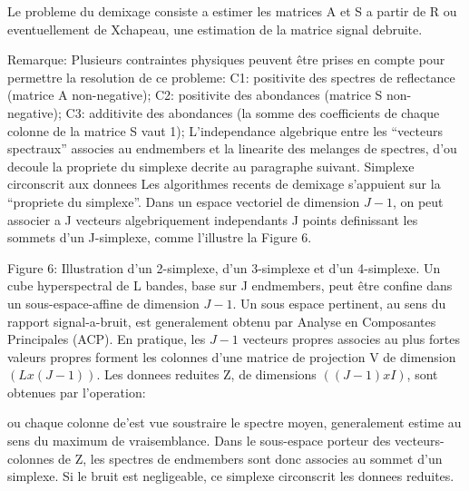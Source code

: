    

Le probleme du demixage consiste a estimer les matrices A et S a
partir de R ou eventuellement de Xchapeau, une estimation de la matrice signal
debruite.

Remarque: Plusieurs contraintes physiques peuvent être prises en
compte pour permettre la resolution de ce probleme: 
C1: positivite
des spectres de reflectance (matrice A non-negative); 
C2: positivite
des abondances (matrice S non-negative); 
C3: additivite des
abondances (la somme des coefficients de chaque colonne de la matrice
S vaut 1); 
L'independance algebrique entre les ``vecteurs spectraux''
associes au endmembers et la linearite des melanges de spectres, d'ou
decoule la propriete du simplexe decrite au paragraphe suivant.
Simplexe circonscrit aux donnees Les algorithmes recents de demixage
s'appuient sur la ``propriete du simplexe''. Dans un espace vectoriel
de dimension $J-1$, on peut associer a J vecteurs algebriquement
independants J points definissant les sommets d'un J-simplexe, comme
l'illustre la Figure 6.

Figure 6: Illustration d'un 2-simplexe, d'un 3-simplexe et d'un
4-simplexe.  Un cube hyperspectral de L bandes, base sur J endmembers,
peut être confine dans un sous-espace-affine de dimension $J-1$.  Un
sous espace pertinent, au sens du rapport signal-a-bruit, est
generalement obtenu par Analyse en Composantes Principales (ACP). En
pratique, les $J-1$ vecteurs propres associes au plus fortes valeurs
propres forment les colonnes d'une matrice de projection V de
dimension $(Lx(J-1))$. Les donnees reduites Z, de dimensions $((J-1)xI)$,
sont obtenues par l'operation:

ou chaque colonne de'est vue soustraire le spectre moyen,
generalement estime au sens du maximum de vraisemblance. Dans le
sous-espace porteur des vecteurs-colonnes de Z, les spectres de
endmembers sont donc associes au sommet d'un simplexe. Si le bruit est
negligeable, ce simplexe circonscrit les donnees reduites.

